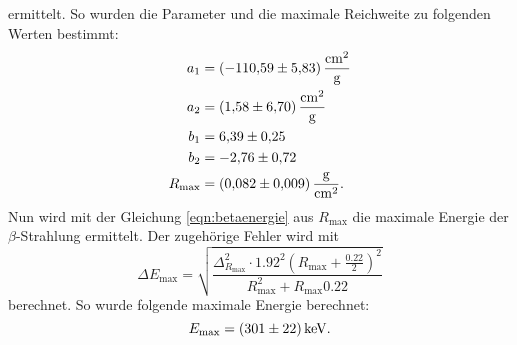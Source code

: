 ermittelt.
So wurden die Parameter und die maximale Reichweite zu folgenden Werten bestimmt:
\begin{align*}
  a_1 &= \SI{-110.59\pm5.83}{\centi\metre\squared\per\gram} \\
  a_2 &= \SI{1.58\pm6.70}{\centi\metre\squared\per\gram} \\
  b_1 &= \num{6.39\pm0.25} \\
  b_2 &= \num{-2.76\pm0.72} \\
  R_\text{max} &= \SI{0.082\pm0.009}{\gram\per\centi\metre\squared} .
\end{align*}
Nun wird mit der Gleichung \eqref{eqn:betaenergie} aus $R_\text{max}$ die maximale Energie der $\beta$-Strahlung ermittelt.
Der zugehörige Fehler wird mit
\begin{equation*}
  \Delta E_\text{max}= \sqrt{\frac{\Delta_{R_{\text{max}}}^{2} \cdot {1.92}^{2} \left(R_{\text{max}} + \frac{{0.22}}{2}\right)^{2}}{R_{\text{max}}^{2} + R_{\text{max}} {0.22}}}
\end{equation*}
berechnet.
So wurde folgende maximale Energie berechnet:
\begin{equation*}
  E_\text{max} = \SI{301\pm22}{\kilo\electronvolt}.
\end{equation*}
